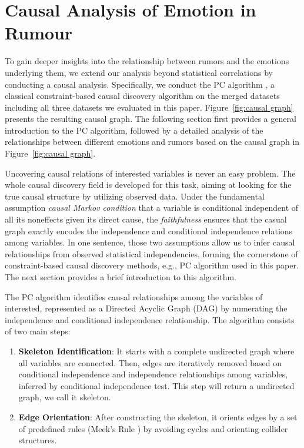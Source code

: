 \section{Causal Analysis of Emotion in Rumour}

To gain deeper insights into the relationship between rumors and the emotions underlying them, we extend our analysis beyond statistical correlations by conducting a causal analysis.
Specifically, we conduct the PC algorithm \cite{Spirtes2000}, a classical constraint-based causal discovery algorithm on the merged datasets including all three datasets we evaluated in this paper. 
Figure~\ref{fig:causal graph} presents the resulting causal graph.
The following section first provides a general introduction to the PC algorithm, followed by a detailed analysis of the relationships between different emotions and rumors based on the causal graph in Figure~\ref{fig:causal graph}.


Uncovering causal relations of interested variables is never an easy problem. 
The whole causal discovery field is developed for this task, aiming at looking for the true causal structure by utilizing observed data. 
Under the fundamental assumption \textit{causal Markov condition} that a variable is conditional independent of all its noneffects given its direct cause, the \textit{faithfulness} ensures that the casual graph exactly encodes the independence and conditional independence relations among variables. 
In one sentence, those two assumptions allow us to infer causal relationships from observed statistical independencies, forming the cornerstone of constraint-based causal discovery methods, e.g., PC algorithm used in this paper. The next section provides a brief introduction to this algorithm.


The PC algorithm identifies causal relationships among the variables of interested, represented as a Directed Acyclic Graph (DAG) by numerating the independence and conditional independence relationship. The algorithm consists of two main steps: 
\begin{enumerate}
    \item \textbf{Skeleton Identification}: It starts with a complete undirected graph where all variables are connected. Then, edges are iteratively removed based on conditional independence and independence relationships among variables, inferred by conditional independence test. This step will return a undirected graph, we call it skeleton. 
    \item \textbf{Edge Orientation}: After constructing the skeleton, it orients edges by a set of predefined rules (Meek's Rule \cite{meek1997graphical}) by avoiding cycles and orienting collider structures.
\end{enumerate}

